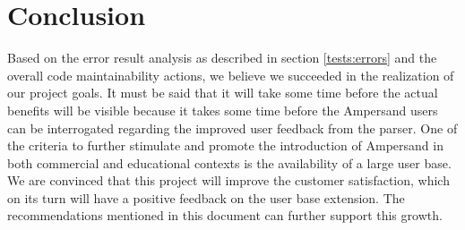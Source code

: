 
\section{Conclusion}
\label{sec:conclusion}
Based on the error result analysis as described in section \autoref{tests:errors} and the overall code maintainability actions, we believe we succeeded in the realization of our project goals.
It must be said that it will take some time before the actual benefits will be visible because it takes some time before the Ampersand users can be interrogated regarding the improved user feedback from the parser.
One of the criteria to further stimulate and promote the introduction of Ampersand in both commercial and educational contexts is the availability of a large user base.
We are convinced that this project will improve the customer satisfaction, which on its turn will have a positive feedback on the user base extension.
The recommendations mentioned in this document can further support this growth.
